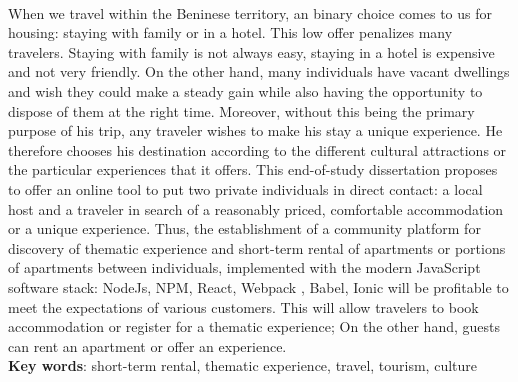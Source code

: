 \\When we travel within the Beninese territory, an binary choice comes to us for housing: staying with family or in a hotel. This low offer penalizes many travelers. Staying with family is not always easy, staying in a hotel is expensive and not very friendly. On the other hand, many individuals have vacant dwellings and wish they could make a steady gain while also having the opportunity to dispose of them at the right time. Moreover, without this being the primary purpose of his trip, any traveler wishes to make his stay a unique experience. He therefore chooses his destination according to the different cultural attractions or the particular experiences that it offers. This end-of-study dissertation proposes to offer an online tool to put two private individuals in direct contact: a local host and a traveler in search of a reasonably priced, comfortable accommodation or a unique experience. Thus, the establishment of a community platform for discovery of thematic experience and short-term rental of apartments or portions of apartments between individuals, implemented with the modern JavaScript software stack: NodeJs, NPM, React, Webpack , Babel, Ionic will be profitable to meet the expectations of various customers. This will allow travelers to book accommodation or register for a thematic experience; On the other hand, guests can rent an apartment or offer an experience.
\\$ $\\ \textbf{Key words}: short-term rental, thematic experience, travel, tourism, culture